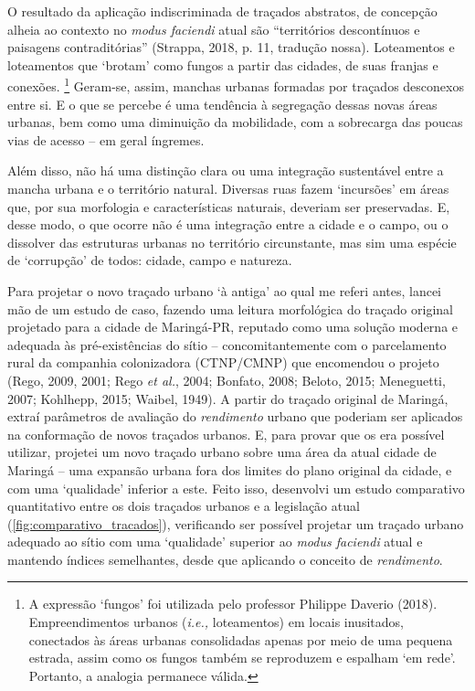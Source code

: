 \documentclass[12pt, a4paper]{book} %
\begin{document}
        O resultado da aplicação indiscriminada de traçados abstratos, de concepção alheia ao contexto no \textit{modus faciendi} atual são ``territórios descontínuos e paisagens contraditórias'' (Strappa, 2018, p. 11, tradução nossa). Loteamentos e loteamentos que `brotam' como fungos a partir das cidades, de suas franjas e conexões.
            \footnote[4]{A expressão `fungos' foi utilizada pelo professor Philippe Daverio (2018). Empreendimentos urbanos (\textit{i.e.,} loteamentos) em locais inusitados, conectados às áreas urbanas consolidadas apenas por meio de uma pequena estrada, assim como os fungos também se reproduzem e espalham `em rede'. Portanto, a analogia permanece válida.} 
        Geram-se, assim, manchas urbanas formadas por traçados desconexos entre si. E o que se percebe é uma tendência à segregação dessas novas áreas urbanas, bem como uma diminuição da mobilidade, com a sobrecarga das poucas vias de acesso – em geral íngremes.

        Além disso, não há uma distinção clara ou uma integração sustentável entre a mancha urbana e o território natural. Diversas ruas fazem `incursões' em áreas que, por sua morfologia e características naturais, deveriam ser preservadas. E, desse modo, o que ocorre não é uma integração entre a cidade e o campo, ou o dissolver das estruturas urbanas no território circunstante, mas sim uma espécie de `corrupção' de todos: cidade, campo e natureza.



        Para projetar o novo traçado urbano `à antiga' ao qual me referi antes, lancei mão de um estudo de caso, fazendo uma leitura morfológica do traçado original projetado para a cidade de Maringá-PR, reputado como uma solução moderna e adequada às pré-existências do sítio – concomitantemente com o parcelamento rural da companhia colonizadora (CTNP/CMNP) que encomendou o projeto (Rego, 2009, 2001; Rego \textit{et al.}, 2004; Bonfato, 2008; Beloto, 2015; Meneguetti, 2007; Kohlhepp, 2015; Waibel, 1949). A partir do traçado original de Maringá, extraí parâmetros de avaliação do \textit{rendimento} urbano que poderiam ser aplicados na conformação de novos traçados urbanos. E, para provar que os era possível utilizar, projetei um novo traçado urbano sobre uma área da atual cidade de Maringá – uma expansão urbana fora dos limites do plano original da cidade, e com uma `qualidade' inferior a este. Feito isso, desenvolvi um estudo comparativo quantitativo entre os dois traçados urbanos e a legislação atual (\autoref{fig:comparativo_tracados}), verificando ser possível projetar um traçado urbano adequado ao sítio com uma `qualidade' superior ao \textit{modus faciendi} atual e mantendo índices semelhantes, desde que aplicando o conceito de \textit{rendimento}.
\end{document}
